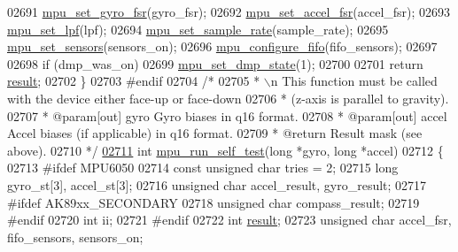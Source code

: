 \begin{DoxyCode}
{{{{{{{{{{{{{{{{{{{{{{{{{{{{{{{{{{02691     \hyperlink{group___d_r_i_v_e_r_s_gad09e6031c8677adc0b8a39b6deea8e27}{mpu\_set\_gyro\_fsr}(gyro\_fsr);
02692     \hyperlink{group___d_r_i_v_e_r_s_ga2713a96af104cfb2ae8e0ed4c3718119}{mpu\_set\_accel\_fsr}(accel\_fsr);
02693     \hyperlink{group___d_r_i_v_e_r_s_ga5661a9dee25152166769910767a2a93d}{mpu\_set\_lpf}(lpf);
02694     \hyperlink{group___d_r_i_v_e_r_s_ga0144d666a67a82888b8580002afe8b55}{mpu\_set\_sample\_rate}(sample\_rate);
02695     \hyperlink{group___d_r_i_v_e_r_s_ga6e77e7cc1cf6be5e8fdf617c5b4586d1}{mpu\_set\_sensors}(sensors\_on);
02696     \hyperlink{group___d_r_i_v_e_r_s_gababbdda287e1f19323489f90a0889dd7}{mpu\_configure\_fifo}(fifo\_sensors);
02697 
02698     \textcolor{keywordflow}{if} (dmp\_was\_on)
02699         \hyperlink{group___d_r_i_v_e_r_s_ga68ed20e6c9663cd7c50469329af8715f}{mpu\_set\_dmp\_state}(1);
02700 
02701     \textcolor{keywordflow}{return} \hyperlink{sensor_8h_a4c9d9cb8bb9d2b707a152051408f40e5}{result};
02702 \}
02703 \textcolor{preprocessor}{#endif}
02704  \textcolor{comment}{/*}
02705 \textcolor{comment}{ *  \(\backslash\)n This function must be called with the device either face-up or face-down}
02706 \textcolor{comment}{ *  (z-axis is parallel to gravity).}
02707 \textcolor{comment}{ *  @param[out] gyro        Gyro biases in q16 format.}
02708 \textcolor{comment}{ *  @param[out] accel       Accel biases (if applicable) in q16 format.}
02709 \textcolor{comment}{ *  @return     Result mask (see above).}
02710 \textcolor{comment}{ */}
\hypertarget{inv__mpu_8c_source.tex_l02711}{}\hyperlink{group___d_r_i_v_e_r_s_ga3773dc98eb1ba15da0091ae75abcf62f}{02711} \textcolor{keywordtype}{int} \hyperlink{group___d_r_i_v_e_r_s_ga3773dc98eb1ba15da0091ae75abcf62f}{mpu\_run\_self\_test}(\textcolor{keywordtype}{long} *gyro, \textcolor{keywordtype}{long} *accel)
02712 \{
02713 \textcolor{preprocessor}{#ifdef MPU6050}
02714     \textcolor{keyword}{const} \textcolor{keywordtype}{unsigned} \textcolor{keywordtype}{char} tries = 2;
02715     \textcolor{keywordtype}{long} gyro\_st[3], accel\_st[3];
02716     \textcolor{keywordtype}{unsigned} \textcolor{keywordtype}{char} accel\_result, gyro\_result;
02717 \textcolor{preprocessor}{#ifdef AK89xx\_SECONDARY}
02718     \textcolor{keywordtype}{unsigned} \textcolor{keywordtype}{char} compass\_result;
02719 \textcolor{preprocessor}{#endif}
02720     \textcolor{keywordtype}{int} ii;
02721 \textcolor{preprocessor}{#endif}
02722     \textcolor{keywordtype}{int} \hyperlink{sensor_8h_a4c9d9cb8bb9d2b707a152051408f40e5}{result};
02723     \textcolor{keywordtype}{unsigned} \textcolor{keywordtype}{char} accel\_fsr, fifo\_sensors, sensors\_on;
}}}}}}}}}}}}}}}}}}}}}}}}}}}}}}}}}}
\end{DoxyCode}
